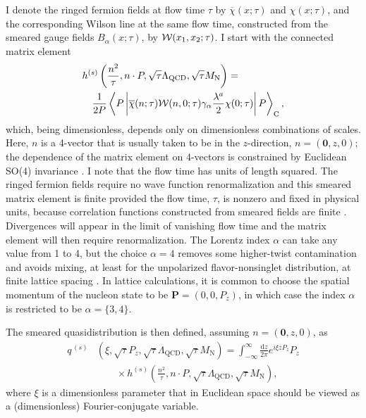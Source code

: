 I denote the ringed fermion fields \cite{Makino:2014taa,Hieda:2016lly} at flow time $\tau$ by $\overline{\chi}(x;\tau)$ and $\chi(x;\tau)$, and the corresponding Wilson line
at the same flow time, constructed from the smeared gauge fields $B_\alpha(x;\tau)$, by ${\bf\cal W}(x_1,x_2;\tau)$. I start with the connected matrix element
\begin{align}\label{eq:hdef}
{} & h^{(s)}\left(\frac{n^2}{\tau},n\cdot P,
\sqrt{\tau}\Lambda_{\mathrm{QCD}},\sqrt{\tau}M_\mathrm{N}\right) = \nonumber\\
{} & \quad
\frac{1}{2P}\left\langle
P \left| \overline{\chi}(n;\tau)
{\bf\cal W}(n,0;\tau)\gamma_\alpha\frac{\lambda^a}{2}\chi(0;\tau)\right|
P\right\rangle_\mathrm{C},
\end{align}
which, being dimensionless, depends only on dimensionless combinations of scales. Here, $n$ is a 4-vector that is usually taken to be in the $z$-direction, $n = (\mathbf{0},z,0)$; the dependence of the matrix element on 4-vectors is constrained by Euclidean SO(4) invariance \cite{Radyushkin:2016hsy}. I note that the flow time has units of length squared. The ringed fermion fields require no wave function renormalization and this smeared matrix element is finite provided the flow time, $\tau$, is nonzero and fixed in physical units,
because correlation functions constructed from smeared fields are finite \cite{Luscher:2011bx,Luscher:2013cpa}. Divergences will appear in the
limit of vanishing flow time and the matrix element will then require renormalization. The Lorentz index $\alpha$ can take any value from 1 to 4, but the choice $\alpha = 4$ removes some higher-twist contamination \cite{Radyushkin:2016hsy} and avoids mixing, at least for the unpolarized flavor-nonsinglet distribution, at finite lattice spacing \cite{Constantinou:2017sej}. In lattice calculations, it is common to choose the spatial momentum of the nucleon state to be $\mathbf{P} = (0,0,P_z)$, in which case the index $\alpha$ is restricted to be $\alpha = \{3,4\}$.

The smeared quasidistribution \cite{Monahan:2016bvm} is then defined, assuming $n = (\mathbf{0},z,0)$, as
\begin{align}\label{eq:qpdfdef}
q^{\,(s)}{} & \left(\xi,\sqrt{\tau}P_z,\sqrt{\tau}\Lambda_{\mathrm{QCD}},
\sqrt{\tau}M_\mathrm{N}\right)
=
\int_{-\infty}^\infty \frac{\mathrm{d}z}{2\pi} e^{i\xi z
P_z} P_z\nonumber \\
{} & \qquad \times h^{(s)}\left(\frac{n^2}{\tau},n\cdot P,\sqrt{\tau}\Lambda_{\mathrm{QCD}},
\sqrt{\tau}M_\mathrm{N}\right),
\end{align}
where $\xi$ is a dimensionless parameter that in Euclidean space should be viewed as a (dimensionless) Fourier-conjugate variable.

